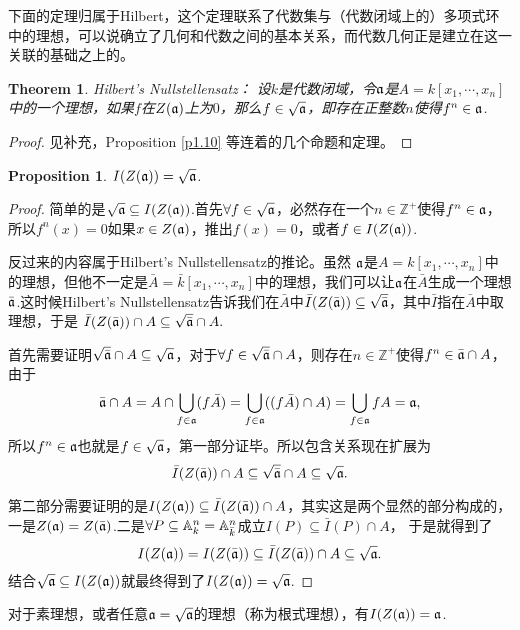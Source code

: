 \documentclass[9pt]{extarticle}
\theoremstyle{plain}%
\newtheorem{pro}[defi]{Proposition}%
\newtheorem{theo}[defi]{Theorem}%
\begin{document}
下面的定理归属于Hilbert，这个定理联系了代数集与（代数闭域上的）多项式环中的理想，可以说确立了几何和代数之间的基本关系，而代数几何正是建立在这一关联的基础之上的。
\begin{theo}Hilbert's Nullstellensatz：
设$k$是代数闭域，令$\mathfrak{a}$是$A=k[x_1,\cdots ,x_n]$中的一个理想，如果$f$在$Z(\mathfrak{a})$上为$0$，那么$f\in \sqrt{\mathfrak{a}}$，即存在正整数$n$使得$f^n\in \mathfrak{a}$.
\end{theo}
\begin{proof}
见补充，Proposition \ref{p1.10} 等连着的几个命题和定理。
\end{proof}
\begin{pro}
$I(Z(\mathfrak{a}))=\sqrt{\mathfrak{a}}$. 
\end{pro}
\begin{proof}
简单的是$\sqrt{\mathfrak{a}}\subseteq I(Z(\mathfrak{a}))$.首先$\forall f\in \sqrt{\mathfrak{a}}$，必然存在一个$n\in \mathbb{Z}^+$使得$f^n\in \mathfrak{a}$，所以$f^n(x)=0$如果$x\in Z(\mathfrak{a})$，推出$f(x)=0$，或者$f\in I(Z(\mathfrak{a}))$.

反过来的内容属于Hilbert's Nullstellensatz的推论。虽然
$\mathfrak{a}$是$A=k[x_1,\cdots,x_n]$中的理想，但他不一定是$\bar{A}=\bar{k}[x_1,\cdots,x_n]$中的理想，我们可以让$\mathfrak{a}$在$\bar{A}$生成一个理想$\bar{\mathfrak{a}}$.这时候Hilbert's Nullstellensatz告诉我们在$\bar{A}$中$\bar{I}(Z(\bar{\mathfrak{a}}))\subseteq\sqrt{\bar{\mathfrak{a}}}$，其中$\bar{I}$指在$\bar{A}$中取理想，于是
$
	\bar{I}(Z(\bar{\mathfrak{a}}))\cap A\subseteq\sqrt{\bar{\mathfrak{a}}}\cap A.
$

首先需要证明$\sqrt{\bar{\mathfrak{a}}}\cap A\subseteq \sqrt{\mathfrak{a}}$，对于$\forall f\in \sqrt{\bar{\mathfrak{a}}}\cap A$，则存在$n\in \mathbb{Z}^+$使得$f^n\in \bar{\mathfrak{a}}\cap A$，由于
\[
	\bar{\mathfrak{a}}\cap A=A\cap\bigcup_{f\in\mathfrak{a}}(f\bar{A})=\bigcup_{f\in\mathfrak{a}}((f\bar{A})\cap A)=\bigcup_{f\in\mathfrak{a}}fA=\mathfrak{a},
\]
所以$f^n\in \mathfrak{a}$也就是$f\in \sqrt{\mathfrak{a}}$，第一部分证毕。所以包含关系现在扩展为
\[
	\bar{I}(Z(\bar{\mathfrak{a}}))\cap A\subseteq\sqrt{\bar{\mathfrak{a}}}\cap A\subseteq \sqrt{\mathfrak{a}}.
\]

第二部分需要证明的是$I(Z(\mathfrak{a}))\subseteq \bar{I}(Z(\bar{\mathfrak{a}}))\cap A$，其实这是两个显然的部分构成的，一是$Z(\mathfrak{a})=Z(\bar{\mathfrak{a}})$.二是$\forall P\subseteq \mathbb{A}^n_k=\mathbb{A}^n_{\bar{k}}$成立$I(P)\subseteq \bar{I}(P)\cap A$，
于是就得到了
\[
	I(Z(\mathfrak{a}))=I(Z(\bar{\mathfrak{a}}))\subseteq \bar{I}(Z(\bar{\mathfrak{a}}))\cap A\subseteq \sqrt{\mathfrak{a}}.
\]
结合$\sqrt{\mathfrak{a}}\subseteq I(Z(\mathfrak{a}))$就最终得到了$I(Z(\mathfrak{a}))=\sqrt{\mathfrak{a}}$.
\end{proof}

对于素理想，或者任意$\mathfrak{a}=\sqrt{\mathfrak{a}}$的理想（称为根式理想），有$I(Z(\mathfrak{a}))=\mathfrak{a}$.
\end{document}
